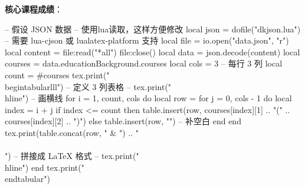 \documentclass[10pt, a4paper, oneside]{ctexart}
\begin{document}
\begin{center}
\begin{minipage}{0.9\textwidth}
        \begin{minipage}{1\linewidth}
            \textbf{核心课程成绩}：
            \vspace{-2em}
            \begin{center}
                \begin{luacode}
                    -- 假设 JSON 数据
                    -- 使用lua读取，这样方便修改
                    local json = dofile("dkjson.lua")  -- 需要 lua-cjson 或 lualatex-platform 支持
                    local file = io.open("data.json", "r")
                    local content = file:read("*all")
                    file:close()
                    local data = json.decode(content)
                    local courses = data.educationBackground.courses
                    local cols = 3  -- 每行 3 列
                    local count = #courses
                    tex.print("\\begin{tabular}{lll}")  -- 定义 3 列表格
                    -- tex.print("\\hline")  -- 画横线
                    for i = 1, count, cols do
                        local row = {}
                        for j = 0, cols - 1 do
                            local index = i + j
                            if index <= count then
                                table.insert(row, courses[index][1] .. "(" .. courses[index][2] .. ")")
                            else
                                table.insert(row, "")  -- 补空白
                            end
                        end
                        tex.print(table.concat(row, " & ") .. " \\\\")  -- 拼接成 LaTeX 格式
                        -- tex.print("\\hline")
                    end
                    tex.print("\\end{tabular}")
                \end{luacode}
            \end{center}
        \end{minipage}
    \end{minipage}
\end{center}
\fi
\end{document}

